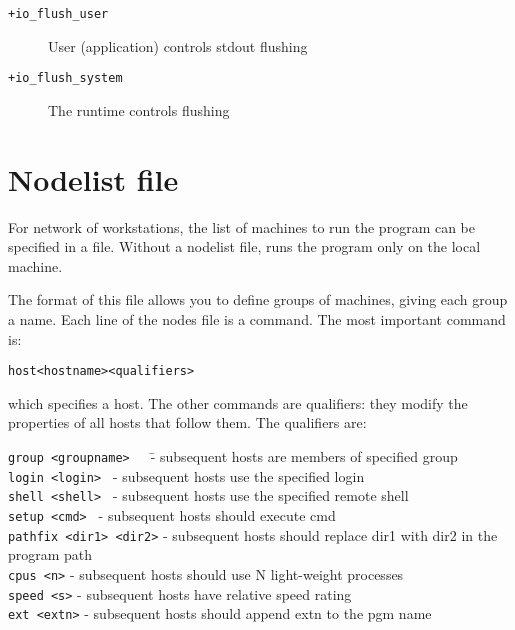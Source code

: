 \begin{description}
\item[{\tt +io\_flush\_user}]     User (application) controls stdout flushing
\item[{\tt +io\_flush\_system}]   The \charmpp{} runtime controls flushing
\end{description}


\section{Nodelist file}

For network of workstations,
the list of machines to run the program can be specified in a file.
Without a nodelist file, \charmpp{} runs the program only on the
local machine.

The format of this file
allows you to define groups of machines, giving each group a name.
Each line of the nodes file is a command.  The most important command
is:

\begin{alltt}
host <hostname> <qualifiers>
\end{alltt}

which specifies a host.  The other commands are qualifiers: they modify
the properties of all hosts that follow them.  The qualifiers are:


\begin{tabbing}
{\tt group <groupname>}~~~\= - subsequent hosts are members of specified group\\
{\tt login <login>  }     \> - subsequent hosts use the specified login\\
{\tt shell <shell>  }     \> - subsequent hosts use the specified remote
shell\\
{\tt setup <cmd>  }       \> - subsequent hosts should execute cmd\\
{\tt pathfix <dir1> <dir2>}         \> - subsequent hosts should replace dir1 with dir2 in the program path\\
{\tt cpus <n>}            \> - subsequent hosts should use N light-weight processes\\
{\tt speed <s>}           \> - subsequent hosts have relative speed rating\\
{\tt ext <extn>}          \> - subsequent hosts should append extn to the pgm name\\
\end{tabbing}

